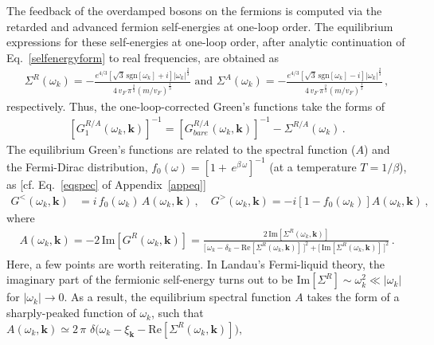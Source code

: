 \documentclass[aps, prb, onecolumn, nofootinbib, citeautoscript, 10pt]{revtex4-2}
\begin{document}
The feedback of the overdamped bosons on the fermions is computed via the retarded and advanced fermion self-energies at one-loop order. The equilibrium expressions for these self-energies at one-loop order, after analytic continuation of Eq.~\eqref{selfenergyform} to real frequencies, are obtained as
\begin{align}
\label{eq-ferm-self-en}
\Sigma^{R}(\omega_k)
= - \frac{e^{4/3} \left[ \sqrt 3\,\text{sgn}[\omega_k]  +  i \right]
	|\omega_k |^{ \frac{2} {3} } } 
{ 4\, v_F\,\pi ^{ \frac{2} {3} } \left( m/v_F\right)^{ \frac{1} {3} } } \text{  and  }
\Sigma^{A}(\omega_k)
= - \frac{e^{4/3} \left[ \sqrt 3\,\text{sgn}[\omega_k] - i \right]
	|\omega_k |^{ \frac{2} {3} } } 
{ 4\, v_F\,\pi ^{ \frac{2} {3} } \left( m/v_F\right)^{ \frac{1} {3} } }\,,
\end{align}
respectively.
Thus, the one-loop-corrected Green's functions take the forms of
\begin{align}
	\left[ G_1^{R/A}(\omega_k, \mathbf{k}) \right]^{-1}
	= \left[ G_{bare}^{R/A}( \omega_k ,\mathbf{k})  \right]^{-1} -\Sigma^{R/A}(\omega_k)\,.
\end{align}
The equilibrium Green's functions are related to the spectral function ($A$) and the Fermi-Dirac distribution, $ f_0(\omega) = [ 1  +  \, e^{\beta \, \omega} ]^{-1} $ (at a temperature $T =1/\beta$), as [cf. Eq.~\eqref{eqspec} of Appendix~\ref{appeq}]
\begin{align}
	G^<(\omega_k,\mathbf k) & = i \, f_0(\omega_k) \, A( \omega_k,\mathbf k) \,,\quad
	G^>(\omega_k,\mathbf k) =-i \left [1- f_0(\omega_k) \right ] A(\omega_k,\mathbf k)\,,
\end{align}
where
\begin{align}
	A( \omega_k,\mathbf k) = -  2\, \text{Im}[G^R(\omega_k,\mathbf{k})]
	=\frac{ 2\, \text{Im} [\Sigma^R( \omega_k,\mathbf k)]}
	{ \Big [ \,\omega_k- \delta_k-\text{Re} [\Sigma^R ( \omega_k,\mathbf k)] \,\Big]^2
		+  \Big [ \, \text{Im} [\Sigma^R ( \omega_k,\mathbf k)] \,\Big]^2} \,.
\end{align}
Here, a few points are worth reiterating.
In Landau's Fermi-liquid theory, the imaginary part of the fermionic self-energy turns out to be $\text{Im}[\Sigma^R] \sim \omega_k^2 \ll |\omega_k| $ for $|\omega_k| \rightarrow 0 $.
As a result, the equilibrium spectral function $A$ takes the form of a sharply-peaked function of $\omega_k$, such that $ A(\omega_k,\mathbf{k}) 
\simeq 2 \,\pi \, \, \delta \big( \omega_k - \xi_\mathbf{k} - \text{Re}[\Sigma^R(\omega_k,\mathbf{k})] \big),$
\end{document}
